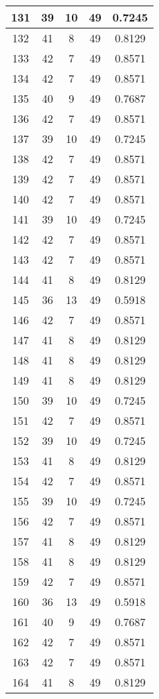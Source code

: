 \documentclass[letterpaper, 12pt]{article}
\begin{document}
\begin{longtable}{|c|c|c|c|c|}
\hline
131 & 39 & 10 & 49 & 0.7245 \\
\hline
132 & 41 & 8 & 49 & 0.8129 \\
\hline
133 & 42 & 7 & 49 & 0.8571 \\
\hline
134 & 42 & 7 & 49 & 0.8571 \\
\hline
135 & 40 & 9 & 49 & 0.7687 \\
\hline
136 & 42 & 7 & 49 & 0.8571 \\
\hline
137 & 39 & 10 & 49 & 0.7245 \\
\hline
138 & 42 & 7 & 49 & 0.8571 \\
\hline
139 & 42 & 7 & 49 & 0.8571 \\
\hline
140 & 42 & 7 & 49 & 0.8571 \\
\hline
141 & 39 & 10 & 49 & 0.7245 \\
\hline
142 & 42 & 7 & 49 & 0.8571 \\
\hline
143 & 42 & 7 & 49 & 0.8571 \\
\hline
144 & 41 & 8 & 49 & 0.8129 \\
\hline
145 & 36 & 13 & 49 & 0.5918 \\
\hline
146 & 42 & 7 & 49 & 0.8571 \\
\hline
147 & 41 & 8 & 49 & 0.8129 \\
\hline
148 & 41 & 8 & 49 & 0.8129 \\
\hline
149 & 41 & 8 & 49 & 0.8129 \\
\hline
150 & 39 & 10 & 49 & 0.7245 \\
\hline
151 & 42 & 7 & 49 & 0.8571 \\
\hline
152 & 39 & 10 & 49 & 0.7245 \\
\hline
153 & 41 & 8 & 49 & 0.8129 \\
\hline
154 & 42 & 7 & 49 & 0.8571 \\
\hline
155 & 39 & 10 & 49 & 0.7245 \\
\hline
156 & 42 & 7 & 49 & 0.8571 \\
\hline
157 & 41 & 8 & 49 & 0.8129 \\
\hline
158 & 41 & 8 & 49 & 0.8129 \\
\hline
159 & 42 & 7 & 49 & 0.8571 \\
\hline
160 & 36 & 13 & 49 & 0.5918 \\
\hline
161 & 40 & 9 & 49 & 0.7687 \\
\hline
162 & 42 & 7 & 49 & 0.8571 \\
\hline
163 & 42 & 7 & 49 & 0.8571 \\
\hline
164 & 41 & 8 & 49 & 0.8129 \\

\end{longtable}
\end{document}
